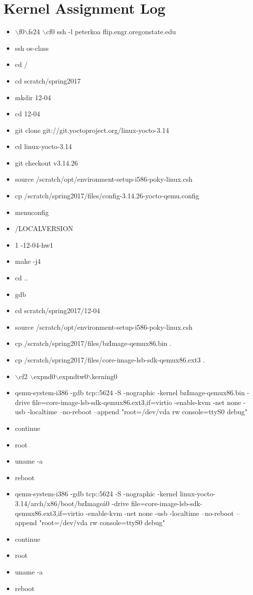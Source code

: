 \documentclass[letterpaper,10pt]{article}
\begin{document}
\tableofcontents

\section{Kernel Assignment Log}
\begin{itemize}
    \item $\backslash$f0$\backslash$fs24 $\backslash$cf0 ssh -l peterkoa flip.engr.oregonstate.edu
    \item ssh os-class
    \item cd /
    \item cd scratch/spring2017
    \item mkdir 12-04
    \item cd 12-04
    \item git clone git://git.yoctoproject.org/linux-yocto-3.14
    \item cd linux-yocto-3.14
    \item git checkout v3.14.26
    \item source /scratch/opt/environment-setup-i586-poky-linux.csh
    \item cp /scratch/spring2017/files/config-3.14.26-yocto-qemu.config
    \item menuconfig
    \item /LOCALVERSION
    \item 1 -12-04-hw1
    \item make -j4
    \item cd ..
    \item gdb
    \item cd scratch/spring2017/12-04
    \item source /scratch/opt/environment-setup-i586-poky-linux.csh
    \item cp /scratch/spring2017/files/bzImage-qemux86.bin .
    \item cp /scratch/spring2017/files/core-image-lsb-sdk-qemux86.ext3 .
    \item $\backslash$cf2 $\backslash$expnd0$\backslash$expndtw0$\backslash$kerning0
    \item qemu-system-i386 -gdb tcp::5624 -S -nographic -kernel bzImage-qemux86.bin -drive         file=core-image-lsb-sdk-qemux86.ext3,if=virtio -enable-kvm -net none -usb -localtime --no-reboot --append "root=/dev/vda rw console=ttyS0 debug"
    \item continue
    \item root
    \item uname -a
    \item reboot
    \item qemu-system-i386 -gdb tcp::5624 -S -nographic -kernel linux-yocto-3.14/arch/x86/boot/bzImage\'a0 -drive file=core-image-lsb-sdk-qemux86.ext3,if=virtio -enable-kvm -net none -usb -localtime --no-reboot --append "root=/dev/vda rw console=ttyS0 debug"
    \item continue
    \item root
    \item uname -a
    \item reboot
\end{itemize}
\end{document}
